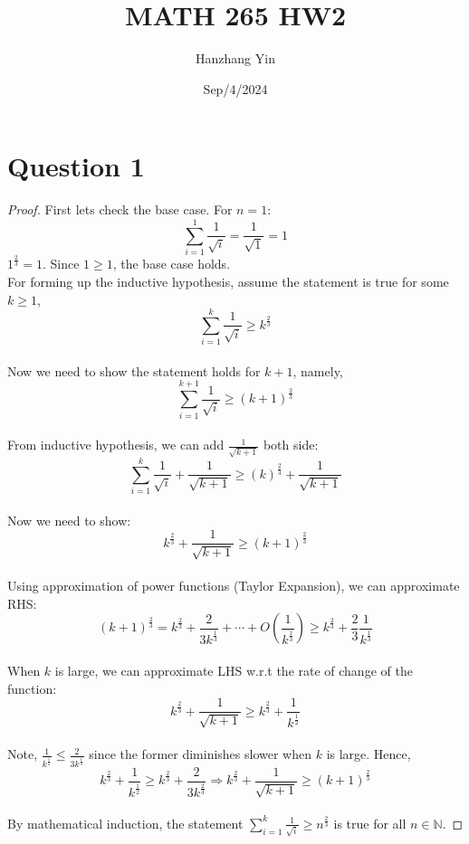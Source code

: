 \documentclass{article}
\title{MATH 265 HW2}
\author{Hanzhang Yin}
\date{Sep/4/2024}
\begin{document}
\maketitle

\section*{Question 1}
\begin{proof}
    First lets check the base case. For $n = 1$: 
    \[ \sum_{i=1}^{1} \frac{1}{\sqrt{i}} = \frac{1}{\sqrt{1}} = 1 \]
    $1^{\frac{2}{3}} = 1$. Since $1 \geq 1$, the base case holds.
    \\
    For forming up the inductive hypothesis, assume the statement is true for some $k \geq 1$, 
    \[ \sum_{i=1}^{k} \frac{1}{\sqrt{i}} \geq k^{\frac{2}{3}}  \]
    \\
    Now we need to show the statement holds for $k + 1$, namely, 
    \[ \sum_{i=1}^{k+1} \frac{1}{\sqrt{i}} \geq (k + 1)^{\frac{2}{3}} \]
    \\
    From inductive hypothesis, we can add $\frac{1}{\sqrt{k+1}}$ both side:
    \[ \sum_{i=1}^{k} \frac{1}{\sqrt{i}} + \frac{1}{\sqrt{k + 1}} \geq (k)^{\frac{2}{3}} + \frac{1}{\sqrt{k + 1}} \]
    \\
    Now we need to show:
    \[ k^{\frac{2}{3}} + \frac{1}{\sqrt{k + 1}} \geq (k + 1)^{\frac{2}{3}} \]
    \\
    Using approximation of power functions (Taylor Expansion), we can approximate RHS: 
    \[ (k + 1)^{\frac{2}{3}} = k^{\frac{2}{3}} + \frac{2}{3k^{\frac{1}{3}}} + \cdots + O \left( \frac{1}{k^{\frac{1}{3}}} \right) \geq k^{\frac{2}{3}} + \frac{2}{3} \frac{1}{k^{\frac{1}{3}}} \]
    \\
    When $k$ is large, we can approximate LHS w.r.t the rate of change of the function:
    \[ k^{\frac{2}{3}} + \frac{1}{\sqrt{k + 1}} \geq k^{\frac{2}{3}} + \frac{1}{k^{\frac{1}{2}}} \]
    \\
    Note, \( \frac{1}{k^{\frac{1}{2}}} \leq \frac{2}{3k^{\frac{1}{3}}} \) since the former diminishes slower when $k$ is large. Hence,
    \[ k^{\frac{2}{3}} + \frac{1}{k^{\frac{1}{2}}} \geq k^{\frac{2}{3}} + \frac{2}{3 k^{\frac{2}{3}}} \Rightarrow k^{\frac{2}{3}} + \frac{1}{\sqrt{k + 1}} \geq (k + 1)^{\frac{2}{3}} \]
    \\
    By mathematical induction, the statement \( \sum_{i=1}^{k} \frac{1}{\sqrt{i}} \geq n^{\frac{2}{3}} \) is true for all $n \in \mathbb{N}$.
\end{proof}
\end{document}
